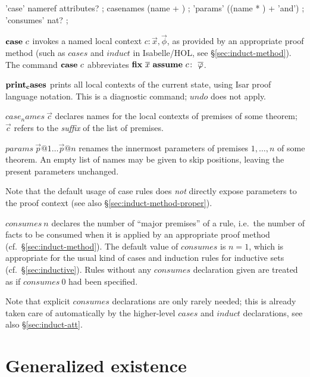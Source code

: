 
\begin{rail}
  'case' nameref attributes?
  ;
  casenames (name + )
  ;
  'params' ((name * ) + 'and')
  ;
  'consumes' nat?
  ;
\end{rail}

\begin{descr}
\item [${\mathord{\mathbf{case}}}~c$] invokes a named local context $c\colon \vec x, \vec \phi$,
  as provided by an appropriate proof method (such as $cases$ and $induct$ in
  Isabelle/HOL, see \S\ref{sec:induct-method}).  The command ${\mathord{\mathbf{case}}}~c$
  abbreviates $\FIX{\vec x}~\ASSUME{c}{\vec\phi}$.
\item [${\mathord{\mathbf{print_cases}}}$] prints all local contexts of the current
  state, using Isar proof language notation.  This is a diagnostic command;
  $undo$ does not apply.
\item [$case_names~\vec c$] declares names for the local contexts of premises
  of some theorem; $\vec c$ refers to the \emph{suffix} of the list of
  premises.
\item [$params~\vec p@1 \dots \vec p@n$] renames the innermost parameters of
  premises $1, \dots, n$ of some theorem.  An empty list of names may be given
  to skip positions, leaving the present parameters unchanged.

  Note that the default usage of case rules does \emph{not} directly expose
  parameters to the proof context (see also \S\ref{sec:induct-method-proper}).
\item [$consumes~n$] declares the number of ``major premises'' of a rule,
  i.e.\ the number of facts to be consumed when it is applied by an
  appropriate proof method (cf.\ \S\ref{sec:induct-method}).  The default
  value of $consumes$ is $n = 1$, which is appropriate for the usual kind of
  cases and induction rules for inductive sets (cf.\ \S\ref{sec:inductive}).
  Rules without any $consumes$ declaration given are treated as if
  $consumes~0$ had been specified.
  
  Note that explicit $consumes$ declarations are only rarely needed; this is
  already taken care of automatically by the higher-level $cases$ and $induct$
  declarations, see also \S\ref{sec:induct-att}.
\end{descr}


\section{Generalized existence}\label{sec:obtain}

